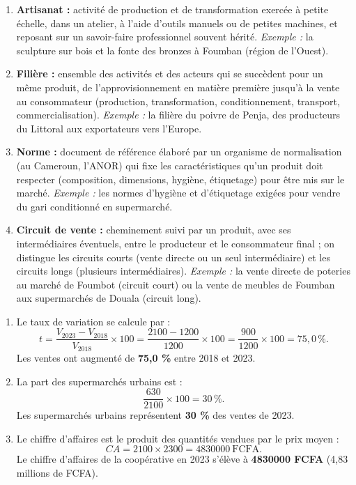 \documentclass[11pt]{article}
\begin{document}
\begin{corrige}
\begin{enumerate}
\item \textbf{Artisanat :} activité de production et de transformation exercée à petite échelle, dans un atelier, à l'aide d'outils manuels ou de petites machines, et reposant sur un savoir-faire professionnel souvent hérité. \emph{Exemple :} la sculpture sur bois et la fonte des bronzes à Foumban (région de l'Ouest).

\item \textbf{Filière :} ensemble des activités et des acteurs qui se succèdent pour un même produit, de l'approvisionnement en matière première jusqu'à la vente au consommateur (production, transformation, conditionnement, transport, commercialisation). \emph{Exemple :} la filière du poivre de Penja, des producteurs du Littoral aux exportateurs vers l'Europe.

\item \textbf{Norme :} document de référence élaboré par un organisme de normalisation (au Cameroun, l'ANOR) qui fixe les caractéristiques qu'un produit doit respecter (composition, dimensions, hygiène, étiquetage) pour être mis sur le marché. \emph{Exemple :} les normes d'hygiène et d'étiquetage exigées pour vendre du gari conditionné en supermarché.

\item \textbf{Circuit de vente :} cheminement suivi par un produit, avec ses intermédiaires éventuels, entre le producteur et le consommateur final ; on distingue les circuits courts (vente directe ou un seul intermédiaire) et les circuits longs (plusieurs intermédiaires). \emph{Exemple :} la vente directe de poteries au marché de Foumbot (circuit court) ou la vente de meubles de Foumban aux supermarchés de Douala (circuit long).
\end{enumerate}
\end{corrige}

\begin{corrige}
\begin{enumerate}
\item Le taux de variation se calcule par :
\[
t = \frac{V_{2023} - V_{2018}}{V_{2018}} \times 100 = \frac{\num{2100} - \num{1200}}{\num{1200}} \times 100 = \frac{900}{\num{1200}} \times 100 = 75,0\,\%.
\]
Les ventes ont augmenté de \textbf{75,0 \%} entre 2018 et 2023.

\item La part des supermarchés urbains est :
\[
\frac{630}{\num{2100}} \times 100 = 30\,\%.
\]
Les supermarchés urbains représentent \textbf{30 \%} des ventes de 2023.

\item Le chiffre d'affaires est le produit des quantités vendues par le prix moyen :
\[
CA = \num{2100} \times \num{2300} = \num{4830000}\ \text{FCFA}.
\]
Le chiffre d'affaires de la coopérative en 2023 s'élève à \textbf{\num{4830000} FCFA} (4,83 millions de FCFA).
\end{enumerate}
\end{corrige}
\end{document}
